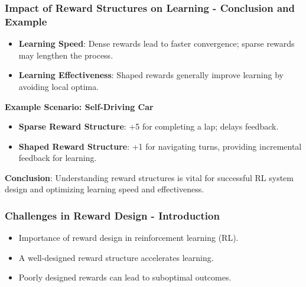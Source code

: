 \documentclass[aspectratio=169]{beamer}
\begin{document}
\begin{frame}[fragile]
    \frametitle{Impact of Reward Structures on Learning - Conclusion and Example}
    \begin{itemize}
        \item \textbf{Learning Speed}: Dense rewards lead to faster convergence; sparse rewards may lengthen the process.
        \item \textbf{Learning Effectiveness}: Shaped rewards generally improve learning by avoiding local optima.
    \end{itemize}
    
    \textbf{Example Scenario: Self-Driving Car}
    \begin{itemize}
        \item \textbf{Sparse Reward Structure}: +5 for completing a lap; delays feedback.
        \item \textbf{Shaped Reward Structure}: +1 for navigating turns, providing incremental feedback for learning.
    \end{itemize}
    
    \textbf{Conclusion}: Understanding reward structures is vital for successful RL system design and optimizing learning speed and effectiveness.
\end{frame}

\begin{frame}[fragile]
    \frametitle{Challenges in Reward Design - Introduction}
    \begin{itemize}
        \item Importance of reward design in reinforcement learning (RL).
        \item A well-designed reward structure accelerates learning.
        \item Poorly designed rewards can lead to suboptimal outcomes.
    \end{itemize}
\end{frame}
\end{document}
